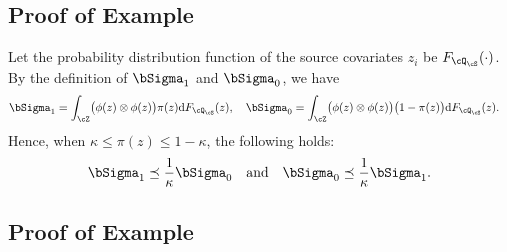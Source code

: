\documentclass[12pt,a4paper,pdftex,onepage]{article}
\newcommand{\Sigmatreated}{\bSigma_{1}}
\newcommand{\Sigmacontrol}{\bSigma_{0}}
\begin{document}
\subsection{Proof of Example~}
Let the probability distribution function of the source covariates \(z_i\) be \(F_{\cQ_\cS}(\cdot)\).
By the definition of \(\Sigmatreated\) and \(\Sigmacontrol\), we have
\begin{align}\label{equation; integral form of moments}
\Sigmatreated 
&= \int_{\cZ} \bigl(\phi(z) \otimes \phi(z)\bigr) \pi(z)\mathrm{d}F_{\cQ_\cS}(z), 
\quad 
\Sigmacontrol  
= \int_{\cZ} \bigl(\phi(z) \otimes \phi(z)\bigr) \bigl(1-\pi(z)\bigr)\mathrm{d}F_{\cQ_\cS}(z).
\end{align}
Hence, when \(\kappa \leq \pi(z) \leq 1-\kappa\), the following holds:
\begin{align*}
\Sigmatreated \preceq \frac{1}{\kappa} \Sigmacontrol 
\quad\text{and}\quad    
\Sigmacontrol  \preceq \frac{1}{\kappa} \Sigmatreated.
\end{align*}

\subsection{Proof of Example~}\label{section; proof weak overlap exampls}
\end{document}
